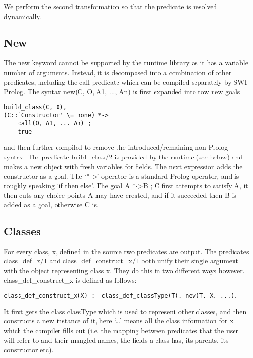 \documentclass[12pt,a4paper,twoside,openright]{report}
\begin{document}
We perform the second transformation so that the predicate is resolved dynamically.

\subsection{New}

The new keyword cannot be supported by the runtime library as it has a variable number of arguments. Instead, it is decomposed into a combination of other predicates, including the call predicate which can be compiled separately by SWI-Prolog. The syntax new(C, O, A1, ..., An) is first expanded into tow new goals

\begin{lstlisting}
build_class(C, O),
(C::`Constructor' \= none) *-> 
	call(O, A1, ... An) ; 
	true
\end{lstlisting}

and then further compiled to remove the introduced/remaining non-Prolog syntax. The predicate build_class/2 is provided by the runtime (see below) and makes a new object with fresh variables for fields. The next expression adds the constructor as a goal. The `*-\textgreater' operator is a standard Prolog operator, and is roughly speaking `if then else'. The goal A *-\textgreater B ; C first attempts to satisfy A, it then cuts any choice points A may have created, and if it succeeded then B is added as a goal, otherwise C is.

\subsection{Classes}

For every class, x, defined in the source two predicates are output. The predicates class_def_x/1 and class_def_construct_x/1 both unify their single argument with the object representing class x. They do this in two different ways however. class_def_construct_x is defined as follows:

\begin{lstlisting}
class_def_construct_x(X) :- class_def_classType(T), new(T, X, ...).
\end{lstlisting}

It first gets the class classType which is used to represent other classes, and then constructs a new instance of it, here `...' means all the class information for x which the compiler fills out (i.e. the mapping between predicates that the user will refer to and their mangled names, the fields a class has, its parents, its constructor etc). 
\end{document}
